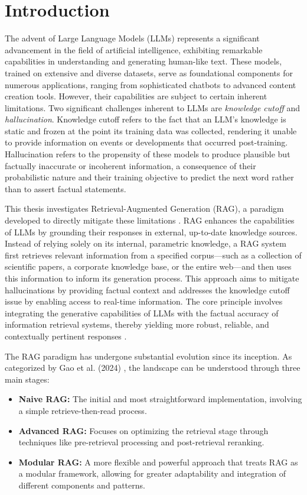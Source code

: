 \chapter{Introduction}
\label{chap:introduction}

The advent of Large Language Models (LLMs) represents a significant advancement in the field of artificial intelligence, exhibiting remarkable capabilities in understanding and generating human-like text. These models, trained on extensive and diverse datasets, serve as foundational components for numerous applications, ranging from sophisticated chatbots to advanced content creation tools. However, their capabilities are subject to certain inherent limitations. Two significant challenges inherent to LLMs are \textit{knowledge cutoff} and \textit{hallucination}. Knowledge cutoff refers to the fact that an LLM's knowledge is static and frozen at the point its training data was collected, rendering it unable to provide information on events or developments that occurred post-training. Hallucination refers to the propensity of these models to produce plausible but factually inaccurate or incoherent information, a consequence of their probabilistic nature and their training objective to predict the next word rather than to assert factual statements.

This thesis investigates Retrieval-Augmented Generation (RAG), a paradigm developed to directly mitigate these limitations \autocite{lewis2020retrieval}. RAG enhances the capabilities of LLMs by grounding their responses in external, up-to-date knowledge sources. Instead of relying solely on its internal, parametric knowledge, a RAG system first retrieves relevant information from a specified corpus—such as a collection of scientific papers, a corporate knowledge base, or the entire web—and then uses this information to inform its generation process. This approach aims to mitigate hallucinations by providing factual context and addresses the knowledge cutoff issue by enabling access to real-time information. The core principle involves integrating the generative capabilities of LLMs with the factual accuracy of information retrieval systems, thereby yielding more robust, reliable, and contextually pertinent responses \autocite{gao2024retrievalaugmented}.

The RAG paradigm has undergone substantial evolution since its inception. As categorized by Gao et al. (2024) \autocite{gao2024retrievalaugmented}, the landscape can be understood through three main stages:
\begin{itemize}
    \item \textbf{Naive RAG:} The initial and most straightforward implementation, involving a simple retrieve-then-read process.
    \item \textbf{Advanced RAG:} Focuses on optimizing the retrieval stage through techniques like pre-retrieval processing and post-retrieval reranking.
    \item \textbf{Modular RAG:} A more flexible and powerful approach that treats RAG as a modular framework, allowing for greater adaptability and integration of different components and patterns.
\end{itemize}

